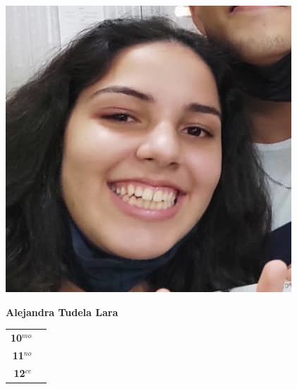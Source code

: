\begin{minipage}{0.2\textwidth}
	\includegraphics[width=\linewidth]{img/concursantes/alejandra.png} %
\end{minipage}
\hfill
\begin{minipage}{0.7\textwidth}
	\textbf{Alejandra Tudela Lara}
	
	\vspace*{0.1in}
	\begin{tabular}{rl}
		
		\textbf{10$^{mo}$} &   \\
		
		\textbf{11$^{no}$} &  \\
		
		\textbf{12$^{ce}$} &   \\
		
		
	\end{tabular}
\end{minipage}

